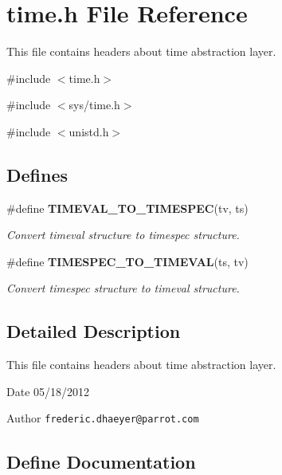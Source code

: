 \section{time.h File Reference}
\label{time_8h}


This file contains headers about time abstraction layer.  


{\ttfamily \#include $<$time.h$>$}\par
{\ttfamily \#include $<$sys/time.h$>$}\par
{\ttfamily \#include $<$unistd.h$>$}\par
\subsection*{Defines}
\begin{DoxyCompactItemize}
\item 
\#define {\bf TIMEVAL\_\-TO\_\-TIMESPEC}(tv, ts)
\begin{DoxyCompactList}\small\item\em Convert timeval structure to timespec structure. \end{DoxyCompactList}\item 
\#define {\bf TIMESPEC\_\-TO\_\-TIMEVAL}(ts, tv)
\begin{DoxyCompactList}\small\item\em Convert timespec structure to timeval structure. \end{DoxyCompactList}\end{DoxyCompactItemize}


\subsection{Detailed Description}
This file contains headers about time abstraction layer. \begin{DoxyDate}{Date}
05/18/2012 
\end{DoxyDate}
\begin{DoxyAuthor}{Author}
{\tt frederic.dhaeyer@parrot.com} 
\end{DoxyAuthor}


\subsection{Define Documentation}
